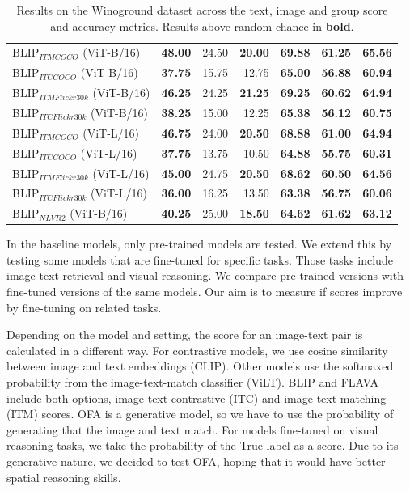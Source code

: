 \begin{table}[ht]
\begin{tabular}{l|rrr|rrr}
 BLIP$_{ITM COCO}$ (ViT-B/16)        & \textbf{48.00} & 24.50          & \textbf{20.00} & \textbf{69.88} & \textbf{61.25} & \textbf{65.56} \\
 BLIP$_{ITC COCO}$ (ViT-B/16)        & \textbf{37.75} & 15.75          & 12.75          & \textbf{65.00} & \textbf{56.88} & \textbf{60.94} \\
 BLIP$_{ITM Flickr30k}$ (ViT-B/16)   & \textbf{46.25} & 24.25          & \textbf{21.25} & \textbf{69.25} & \textbf{60.62} & \textbf{64.94} \\
 BLIP$_{ITC Flickr30k}$ (ViT-B/16)   & \textbf{38.25} & 15.00          & 12.25          & \textbf{65.38} & \textbf{56.12} & \textbf{60.75} \\
 BLIP$_{ITM COCO}$ (ViT-L/16)        & \textbf{46.75} & 24.00          & \textbf{20.50} & \textbf{68.88} & \textbf{61.00} & \textbf{64.94} \\
 BLIP$_{ITC COCO}$ (ViT-L/16)        & \textbf{37.75} & 13.75          & 10.50          & \textbf{64.88} & \textbf{55.75} & \textbf{60.31} \\
 BLIP$_{ITM Flickr30k}$ (ViT-L/16)   & \textbf{45.00} & 24.75          & \textbf{20.50} & \textbf{68.62} & \textbf{60.50} & \textbf{64.56} \\
 BLIP$_{ITC Flickr30k}$ (ViT-L/16)   & \textbf{36.00} & 16.25          & 13.50          & \textbf{63.38} & \textbf{56.75} & \textbf{60.06} \\
 BLIP$_{NLVR2}$ (ViT-B/16)           & \textbf{40.25} & 25.00          & \textbf{18.50} & \textbf{64.62} & \textbf{61.62} & \textbf{63.12} \\
\bottomrule
\end{tabular}
\caption{Results on the Winoground dataset across the text, image and group score and accuracy metrics. Results above random chance in \textbf{bold}.}
\label{tab:results_aggr_ours}
\end{table}

In the baseline models, only pre-trained models are tested. We extend this by testing some models that are fine-tuned for specific tasks. Those tasks include image-text retrieval and visual reasoning. We compare pre-trained versions with fine-tuned versions of the same models. Our aim is to measure if scores improve by fine-tuning on related tasks.

Depending on the model and setting, the score for an image-text pair is calculated in a different way. For contrastive models, we use cosine similarity between image and text embeddings (CLIP). Other models use the softmaxed probability from the image-text-match classifier (ViLT). BLIP and FLAVA include both options, image-text contrastive (ITC) and image-text matching (ITM) scores. OFA is a generative model, so we have to use the probability of generating that the image and text match. For models fine-tuned on visual reasoning tasks, we take the probability of the True label as a score. Due to its generative nature, we decided to test OFA, hoping that it would have better spatial reasoning skills.

